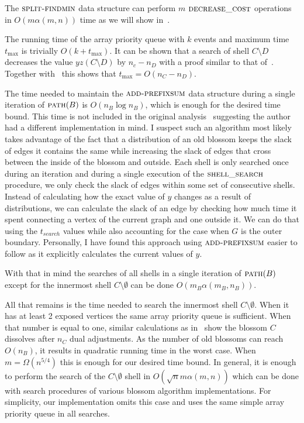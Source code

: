 The $\textsc{split-findmin}$ data structure can perform $m$ $\textsc{decrease\_cost}$ operations in $O(m\alpha(m,n))$ time as we will show in~.

The running time of the array priority queue with $k$ events and maximum time $t_{\max}$ is trivially $O(k + t_{\max})$. It can be shown that a search of shell $C \setminus D$ decreases the value $yz(C \setminus D)$ by $n_c - n_D$ with a proof similar to that of~. Together with~ this shows that $t_{\max} = O(n_C - n_D)$. 

The time needed to maintain the $\textsc{add-prefixsum}$ data structure during a single iteration of $\textsc{path}(B)$ is $O(n_B \log n_B)$, which is enough for the desired time bound. This time is not included in the original analysis~\cite{gabow1984scaling} suggesting the author had a different implementation in mind. I suspect such an algorithm most likely takes advantage of the fact that a distribution of an old blossom keeps the slack of edges it contains the same while increasing the slack of edges that cross between the inside of the blossom and outside. Each shell is only searched once during an iteration and during a single execution of the $\textsc{shell\_search}$ procedure, we only check the slack of edges within some set of consecutive shells. Instead of calculating how the exact value of $y$ changes as a result of distributions, we can calculate the slack of an edge by checking how much time it spent connecting a vertex of the current graph and one outside it. We can do that using the $t_{search}$ values while also accounting for the case when $G$ is the outer boundary. Personally, I have found this approach using $\textsc{add-prefixsum}$ easier to follow as it explicitly calculates the current values of $y$.

With that in mind the searches of all shells in a single iteration of $\textsc{path}(B)$ except for the innermost shell $C \setminus \emptyset$ can be done $O(m_B \alpha(m_B, n_B))$. 

All that remains is the time needed to search the innermost shell $C \setminus \emptyset$. When it has at least 2 exposed vertices the same array priority queue is sufficient. When that number is equal to one, similar calculations as in~ show the blossom $C$ dissolves after $n_C$ dual adjustments. As the number of old blossoms can reach $O(n_B)$, it results in quadratic running time in the worst case. When $m = \Omega(n^{5/4})$ this is enough for our desired time bound. In general, it is enough to perform the search of the $C \setminus \emptyset$ shell in $O(\sqrt{n}m \alpha(m,n))$ which can be done with search procedures of various blossom algorithm implementations. For simplicity, our implementation omits this case and uses the same simple array priority queue in all searches.

